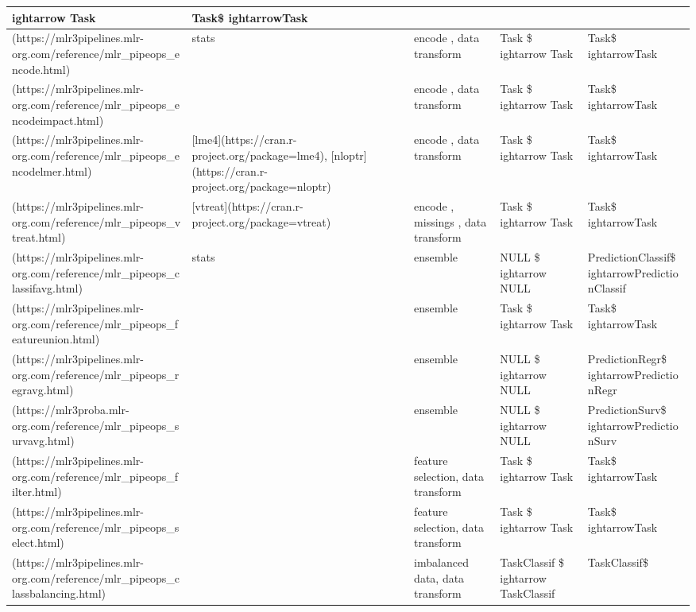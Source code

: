 \documentclass[
]{scrbook}
\begin{document}
\begin{tabular}{l|l|l|l|l}
ightarrow Task & Task\$
ightarrowTask\\
\hline
[`encode`](https://mlr3pipelines.mlr-org.com/reference/mlr\_pipeops\_encode.html) & stats & encode        , data transform & Task \$
ightarrow Task & Task\$
ightarrowTask\\
\hline
[`encodeimpact`](https://mlr3pipelines.mlr-org.com/reference/mlr\_pipeops\_encodeimpact.html) &  & encode        , data transform & Task \$
ightarrow Task & Task\$
ightarrowTask\\
\hline
[`encodelmer`](https://mlr3pipelines.mlr-org.com/reference/mlr\_pipeops\_encodelmer.html) & [lme4](https://cran.r-project.org/package=lme4), [nloptr](https://cran.r-project.org/package=nloptr) & encode        , data transform & Task \$
ightarrow Task & Task\$
ightarrowTask\\
\hline
[`vtreat`](https://mlr3pipelines.mlr-org.com/reference/mlr\_pipeops\_vtreat.html) & [vtreat](https://cran.r-project.org/package=vtreat) & encode        , missings      , data transform & Task \$
ightarrow Task & Task\$
ightarrowTask\\
\hline
[`classifavg`](https://mlr3pipelines.mlr-org.com/reference/mlr\_pipeops\_classifavg.html) & stats & ensemble & NULL \$
ightarrow NULL & PredictionClassif\$
ightarrowPredictionClassif\\
\hline
[`featureunion`](https://mlr3pipelines.mlr-org.com/reference/mlr\_pipeops\_featureunion.html) &  & ensemble & Task \$
ightarrow Task & Task\$
ightarrowTask\\
\hline
[`regravg`](https://mlr3pipelines.mlr-org.com/reference/mlr\_pipeops\_regravg.html) &  & ensemble & NULL \$
ightarrow NULL & PredictionRegr\$
ightarrowPredictionRegr\\
\hline
[`survavg`](https://mlr3proba.mlr-org.com/reference/mlr\_pipeops\_survavg.html) &  & ensemble & NULL \$
ightarrow NULL & PredictionSurv\$
ightarrowPredictionSurv\\
\hline
[`filter`](https://mlr3pipelines.mlr-org.com/reference/mlr\_pipeops\_filter.html) &  & feature selection, data transform & Task \$
ightarrow Task & Task\$
ightarrowTask\\
\hline
[`select`](https://mlr3pipelines.mlr-org.com/reference/mlr\_pipeops\_select.html) &  & feature selection, data transform & Task \$
ightarrow Task & Task\$
ightarrowTask\\
\hline
[`classbalancing`](https://mlr3pipelines.mlr-org.com/reference/mlr\_pipeops\_classbalancing.html) &  & imbalanced data, data transform & TaskClassif \$
ightarrow TaskClassif & TaskClassif\$

\end{tabular}
\end{document}
